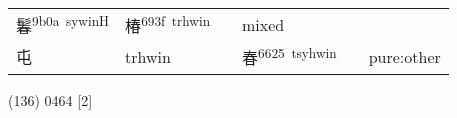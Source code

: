 \documentclass[14pt,a4paper]{scrartcl}
\begin{document}
\begin{longtable}[c]{@{}llllll@{}}
\begin{minipage}[t]{0.14\columnwidth}
鬊\textsuperscript{9b0a~sywinH}
\strut\end{minipage} &
\begin{minipage}[t]{0.14\columnwidth}\raggedright\strut
椿\textsuperscript{693f~trhwin}
\strut\end{minipage} &
\begin{minipage}[t]{0.14\columnwidth}\raggedright\strut
\strut\end{minipage} &
\begin{minipage}[t]{0.14\columnwidth}\raggedright\strut
mixed
\strut\end{minipage}\tabularnewline
\begin{minipage}[t]{0.14\columnwidth}\raggedright\strut
屯
\strut\end{minipage} &
\begin{minipage}[t]{0.14\columnwidth}\raggedright\strut
trhwin
\strut\end{minipage} &
\begin{minipage}[t]{0.14\columnwidth}\raggedright\strut
\strut\end{minipage} &
\begin{minipage}[t]{0.14\columnwidth}\raggedright\strut
春\textsuperscript{6625~tsyhwin}
\strut\end{minipage} &
\begin{minipage}[t]{0.14\columnwidth}\raggedright\strut
\strut\end{minipage} &
\begin{minipage}[t]{0.14\columnwidth}\raggedright\strut
pure:other
\strut\end{minipage}\tabularnewline
\bottomrule
\end{longtable}

(136) 0464 {[}2{]}
\end{document}
